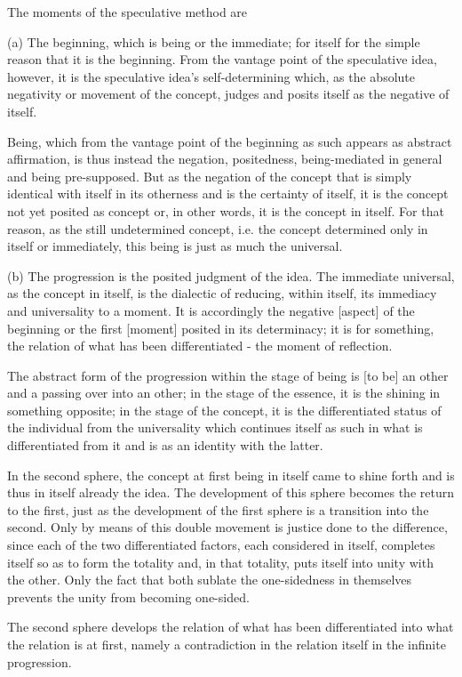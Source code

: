 The moments of the speculative method are

(a) The beginning, which is being or the immediate;
for itself for the simple reason that it is the beginning.
From the vantage point of the speculative idea, however,
it is the speculative idea's self-determining which,
as the absolute negativity or movement of the concept,
judges and posits itself as the negative of itself.

Being, which from the vantage point of the beginning as such
appears as abstract affirmation, is thus instead the negation,
positedness, being-mediated in general and being pre-supposed.
But as the negation of the concept that is simply identical
with itself in its otherness and is the certainty of itself,
it is the concept not yet posited as concept or, in other words,
it is the concept in itself.
For that reason, as the still undetermined concept,
i.e. the concept determined only in itself or immediately,
this being is just as much the universal.

(b) The progression is the posited judgment of the idea.
The immediate universal, as the concept in itself,
is the dialectic of reducing, within itself,
its immediacy and universality to a moment.
It is accordingly the negative [aspect] of the beginning or
the first [moment] posited in its determinacy;
it is for something, the relation of what has been differentiated
- the moment of reflection.

The abstract form of the progression within the stage of being is
[to be] an other and a passing over into an other;
in the stage of the essence, it is the shining in something opposite;
in the stage of the concept, it is the differentiated status
of the individual from the universality which continues itself as such
in what is differentiated from it and is as an identity with the latter.

In the second sphere, the concept at first being in itself came to
shine forth and is thus in itself already the idea.
The development of this sphere becomes the return to the first,
just as the development of the first sphere is a transition into the second.
Only by means of this double movement is justice done to the difference,
since each of the two differentiated factors, each considered in itself,
completes itself so as to form the totality and, in that totality,
puts itself into unity with the other.
Only the fact that both sublate the one-sidedness
in themselves prevents the unity from becoming one-sided.

The second sphere develops the relation of
what has been differentiated
into what the relation is at first,
namely a contradiction in the relation itself
in the infinite progression.

